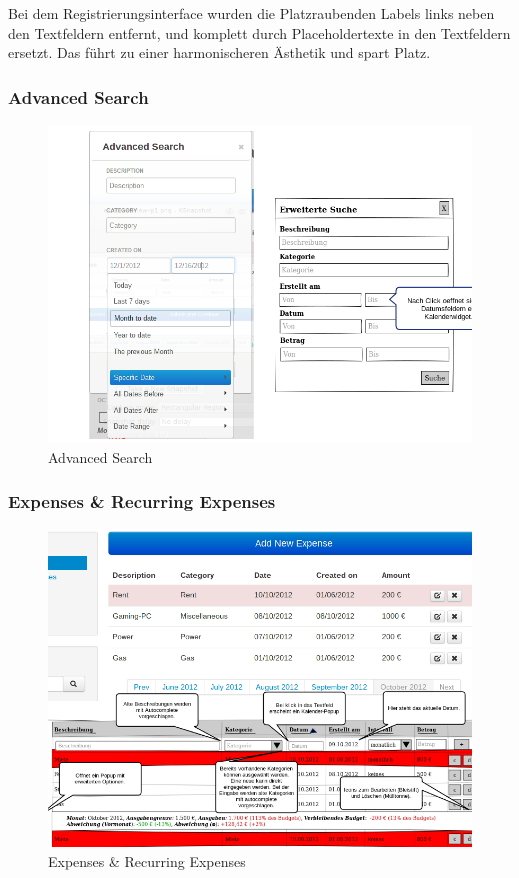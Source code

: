 \documentclass[a4paper,10pt]{article}
\begin{document}
Bei dem Registrierungsinterface wurden die Platzraubenden Labels links neben den Textfeldern entfernt, 
und komplett durch Placeholdertexte in den Textfeldern ersetzt. Das führt zu einer harmonischeren Ästhetik und spart Platz.

\clearpage
\subsubsection{Advanced Search}

\begin{figure}
\centering
\includegraphics[width=\textwidth]{advanced-search}
\caption{Advanced Search} \label{fig:advanced-search}
\end{figure}


\clearpage
\subsubsection{Expenses \& Recurring Expenses}

\begin{figure}
\centering
\includegraphics[width=\textwidth]{expenses}
\caption{Expenses \& Recurring Expenses} \label{fig:expenses}
\end{figure}
\end{document}

